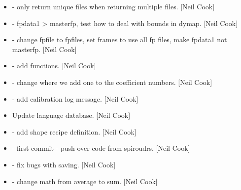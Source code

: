 \documentclass[a4paper,10pt,english]{report}
\begin{document}
\begin{itemize}
\item {} 
 - only return unique files when returning multiple
files. {[}Neil Cook{]}

\item {} 
 - fpdata1 \textendash{}\textgreater{} masterfp, test how to deal with bounds in
dymap. {[}Neil Cook{]}

\item {} 
 - change fpfile to fpfiles, set frames to
use all fp files, make fpdata1 not masterfp. {[}Neil Cook{]}

\item {} 
 - add  functions. {[}Neil Cook{]}

\item {} 
 - change where we add one to the
coefficient numbers. {[}Neil Cook{]}

\item {} 
 - add calibration log message. {[}Neil Cook{]}

\item {} 
Update language database. {[}Neil Cook{]}

\item {} 
 - add
shape  recipe definition. {[}Neil Cook{]}

\item {} 
 - first commit - push over code from spiroudrs.
{[}Neil Cook{]}

\item {} 
 - fix bugs with saving. {[}Neil Cook{]}

\item {} 
 - change math from average to sum. {[}Neil Cook{]}

\end{itemize}
\end{document}
